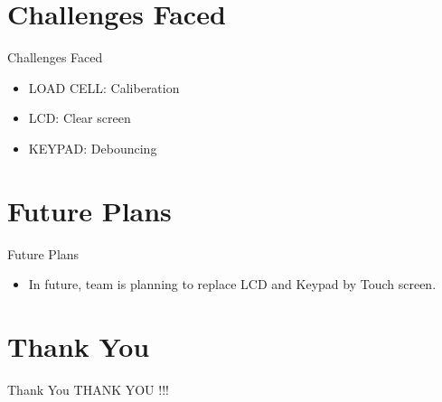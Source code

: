\documentclass[10pt, a4paper]{beamer}
\begin{document}
\section{Challenges Faced}
\begin{frame}{Challenges Faced}
	\begin{itemize}
		\item LOAD CELL:\hspace{.1in} Caliberation
		\item LCD:\hspace{.1in} Clear screen
		\item KEYPAD:\hspace{.1in} Debouncing
	\end{itemize}
\end{frame}

\section{Future Plans}
\begin{frame}{Future Plans}
	\begin{itemize}
		\item In future, team is planning to replace LCD and Keypad by Touch screen. 
	\end{itemize}
\end{frame}


\section{Thank You}
\begin{frame}{Thank You}
	\centering THANK YOU !!!
\end{frame}
\end{document}
